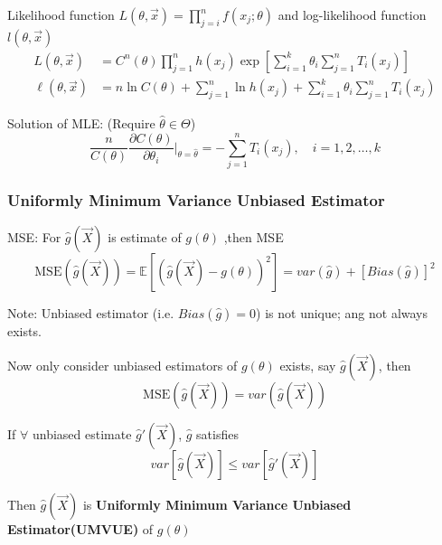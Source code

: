         Likelihood function $L(\theta,\vec{x})=\prod_{j=i}^nf(x_j;\theta)$ and log-likelihood function $l(\theta,\vec{x})$
        \begin{align*}
            L(\theta,\vec{x})&=C^n(\theta)\prod_{j=1}^nh(x_j)\exp\left[\sum_{i=1}^k\theta_i\sum_{j=1}^n T_i(x_j)\right]\\
            \ell(\theta,\vec{x})&=n\ln C(\theta)+\sum_{j=1}^n\ln h(x_j)+\sum_{i=1}^k\theta_i\sum_{j=1}^nT_i(x_j)
        \end{align*}

        Solution of MLE: (Require $\hat{\theta}\in\Theta$)
        \begin{equation}
            \frac{n}{C(\theta)}\frac{\partial C(\theta)}{\partial \theta_i}\bigg|_{\theta=\hat{\theta}}=-\sum_{j=1}^nT_i(x_j),\quad i=1,2,\ldots,k    
        \end{equation}


\subsubsection{Uniformly Minimum Variance Unbiased Estimator}\label{SubSectionUMVUE}
        MSE: For $\hat{g}(\vec{X})$ is estimate of $g(\theta)$ ,then MSE
        \begin{equation}
            \mathrm{MSE}(\hat{g}(\vec{X}))=\mathbb{E}[(\hat{g}(\vec{X})-g(\theta))^2]=var(\hat{g})+[Bias(\hat{g})]^2
        \end{equation}

        Note:
    Unbiased estimator (i.e. $Bias(\hat{g})=0$) is not unique; ang not always exists.


    


        Now only consider unbiased estimators of $g(\theta)$ exists, say $\hat{g}(\vec{X})$, then
        \begin{equation} \mathrm{MSE}(\hat{g}(\vec{X}))=var(\hat{g}(\vec{X})) \end{equation}

        If $\forall$ unbiased estimate $\hat{g}\prime(\vec{X})$, $\hat{g}$ satisfies
        \begin{equation}
            var[\hat{g}(\vec{X})]\leq var[\hat{g}\prime(\vec{X})]    
        \end{equation}

\begin{point}
        Then $\hat{g}(\vec{X})$ is \textbf{Uniformly Minimum Variance Unbiased Estimator(UMVUE)} of $g(\theta)$
\end{point}


